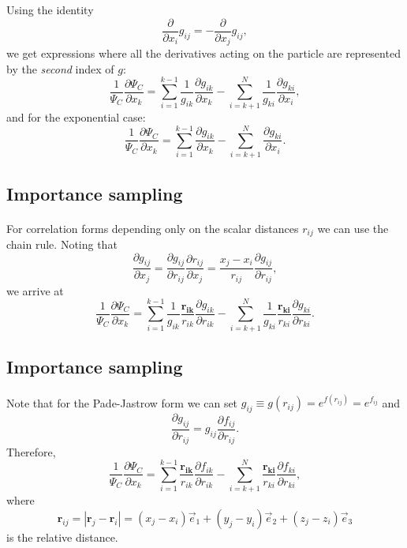 \documentclass[%
twoside,                 %
final,                   %
10pt]{article}
\begin{document}
{{{{{{Using the identity 
\[
\frac{\partial}{\partial x_i}g_{ij} = -\frac{\partial}{\partial x_j}g_{ij},
\]
we get expressions where all the derivatives acting on the particle  are represented by the \emph{second} index of $g$:
\[
\frac{1}{\Psi_C}\frac{\partial \Psi_C}{\partial x_k} =
\sum_{i=1}^{k-1}\frac{1}{g_{ik}}\frac{\partial g_{ik}}{\partial x_k}
-\sum_{i=k+1}^{N}\frac{1}{g_{ki}}\frac{\partial g_{ki}}{\partial x_i},
\]
and for the exponential case:
\[
\frac{1}{\Psi_C}\frac{\partial \Psi_C}{\partial x_k} =
\sum_{i=1}^{k-1}\frac{\partial g_{ik}}{\partial x_k}
-\sum_{i=k+1}^{N}\frac{\partial g_{ki}}{\partial x_i}.
\]



\subsection{Importance sampling}

\paragraph{}
For correlation forms depending only on the scalar distances $r_{ij}$ we can use the chain rule. Noting that 
\[
\frac{\partial g_{ij}}{\partial x_j} = \frac{\partial g_{ij}}{\partial r_{ij}} \frac{\partial r_{ij}}{\partial x_j} = \frac{x_j - x_i}{r_{ij}} \frac{\partial g_{ij}}{\partial r_{ij}},
\]
we arrive at
\[
\frac{1}{\Psi_C}\frac{\partial \Psi_C}{\partial x_k} = 
\sum_{i=1}^{k-1}\frac{1}{g_{ik}} \frac{\mathbf{r_{ik}}}{r_{ik}} \frac{\partial g_{ik}}{\partial r_{ik}}
-\sum_{i=k+1}^{N}\frac{1}{g_{ki}}\frac{\mathbf{r_{ki}}}{r_{ki}}\frac{\partial g_{ki}}{\partial r_{ki}}.
\]




\subsection{Importance sampling}

\paragraph{}
Note that for the Pade-Jastrow form we can set $g_{ij} \equiv g(r_{ij}) = e^{f(r_{ij})} = e^{f_{ij}}$ and 
\[
\frac{\partial g_{ij}}{\partial r_{ij}} = g_{ij} \frac{\partial f_{ij}}{\partial r_{ij}}.
\]
Therefore, 
\[
\frac{1}{\Psi_{C}}\frac{\partial \Psi_{C}}{\partial x_k} =
\sum_{i=1}^{k-1}\frac{\mathbf{r_{ik}}}{r_{ik}}\frac{\partial f_{ik}}{\partial r_{ik}}
-\sum_{i=k+1}^{N}\frac{\mathbf{r_{ki}}}{r_{ki}}\frac{\partial f_{ki}}{\partial r_{ki}},
\]
where 
\[
 \mathbf{r}_{ij} = |\mathbf{r}_j - \mathbf{r}_i| = (x_j - x_i)\vec{e}_1 + (y_j - y_i)\vec{e}_2 + (z_j - z_i)\vec{e}_3
\]
is the relative distance.




}}}}}}
\end{document}
